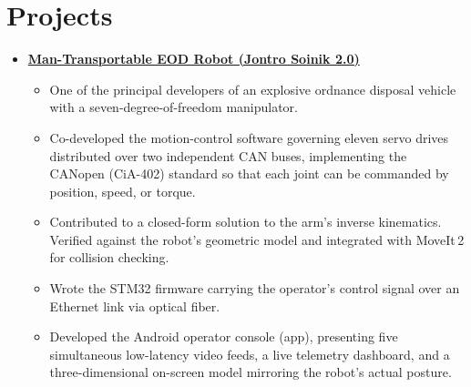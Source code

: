 \documentclass[10pt]{article}
\begin{document}
\section*{Projects}
\begin{itemize}[label={}, leftmargin=0pt, itemsep=5pt]

    \item \textbf{\href{https://www.youtube.com/watch?v=Bf5ViUtLQ4g}{Man-Transportable EOD Robot
    (Jontro Soinik 2.0)}}
    \begin{itemize}
        \item One of the principal developers of an explosive ordnance disposal
        vehicle with a seven-degree-of-freedom manipulator.
        \item Co-developed the motion-control software governing eleven servo drives distributed over
        two independent CAN buses, implementing the CANopen (CiA-402) standard so that each joint
        can be commanded by position, speed, or torque.
        \item Contributed to a closed-form solution to the arm's inverse kinematics. Verified
        against the robot's geometric model and integrated with MoveIt\,2 for collision checking.
        \item Wrote the STM32 firmware carrying the operator's control signal over an Ethernet
        link via optical fiber.
        \item Developed the Android operator console (app), presenting five simultaneous low-latency
        video feeds, a live telemetry dashboard, and a three-dimensional on-screen model mirroring
        the robot's actual posture.
    \end{itemize}


\end{itemize}
\end{document}
